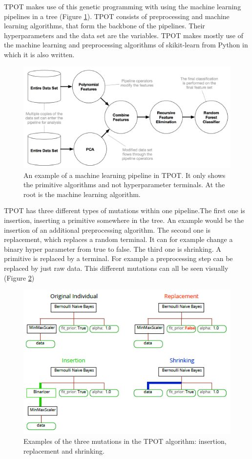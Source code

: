 \documentclass[10pt,a4paper]{article}
\begin{document}
	TPOT makes use of this genetic programming with using the machine learning pipelines in a tree (Figure \ref{fig:MachineLearningPipeline}). TPOT consists of preprocessing and machine learning algorithms, that form the backbone of the pipelines. Their hyperparameters and the data set are the variables. TPOT makes mostly use of the machine learning and preprocessing algorithms of skikit-learn from Python in which it is also written.
	
	\begin{figure}[h!]
		\includegraphics[scale=1]{MachineLearningPipeline.png}
		\caption{An example of a machine learning pipeline in TPOT. It only shows the primitive algorithms and not hyperparameter terminals. At the root is the machine learning algorithm. \cite{Gijsbers2017Thesis}}
		\label{fig:MachineLearningPipeline}
	\end{figure}

	TPOT has three different types of mutations within one pipeline.The first one is insertion, inserting a primitive somewhere in the tree. An example would be the insertion of an additional preprocessing algorithm. The second one is replacement, which replaces a random terminal. It can for example change a binary hyper parameter from true to false. The third one is shrinking. A primitive is replaced by a terminal. For example a preprocessing step can be replaced by just raw data. This different mutations can all be seen visually (Figure \ref{fig:TPOTMutations})
	
	\begin{figure}[h!]
		\includegraphics[scale=1]{TPOTMutations.png}
		\caption{Examples of the three mutations in the TPOT algorithm: insertion, replacement and shrinking. \cite{Gijsbers2017Thesis}}
		\label{fig:TPOTMutations}
	\end{figure}
	
\end{document}
